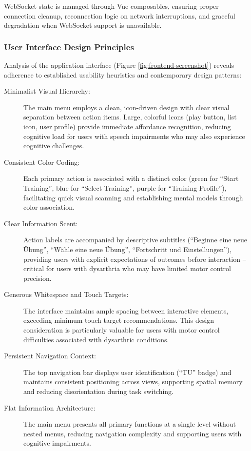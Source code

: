 WebSocket state is managed through Vue composables, ensuring proper connection cleanup, reconnection logic on network interruptions, and graceful degradation when WebSocket support is unavailable.

\subsubsection{User Interface Design Principles}

Analysis of the application interface (Figure \ref{fig:frontend-screenshot}) reveals adherence to established usability heuristics and contemporary design patterns:

\begin{description}
    \item[Minimalist Visual Hierarchy:] The main menu employs a clean, icon-driven design with clear visual separation between action items. Large, colorful icons (play button, list icon, user profile) provide immediate affordance recognition, reducing cognitive load for users with speech impairments who may also experience cognitive challenges.
    
    \item[Consistent Color Coding:] Each primary action is associated with a distinct color (green for ``Start Training'', blue for ``Select Training'', purple for ``Training Profile''), facilitating quick visual scanning and establishing mental models through color association.
    
    \item[Clear Information Scent:] Action labels are accompanied by descriptive subtitles (``Beginne eine neue Übung'', ``Wähle eine neue Übung'', ``Fortschritt und Einstellungen''), providing users with explicit expectations of outcomes before interaction -- critical for users with dysarthria who may have limited motor control precision.
    
    \item[Generous Whitespace and Touch Targets:] The interface maintains ample spacing between interactive elements, exceeding minimum touch target recommendations. This design consideration is particularly valuable for users with motor control difficulties associated with dysarthric conditions.
    
    \item[Persistent Navigation Context:] The top navigation bar displays user identification (``TU'' badge) and maintains consistent positioning across views, supporting spatial memory and reducing disorientation during task switching.
    
    \item[Flat Information Architecture:] The main menu presents all primary functions at a single level without nested menus, reducing navigation complexity and supporting users with cognitive impairments.
\end{description}

